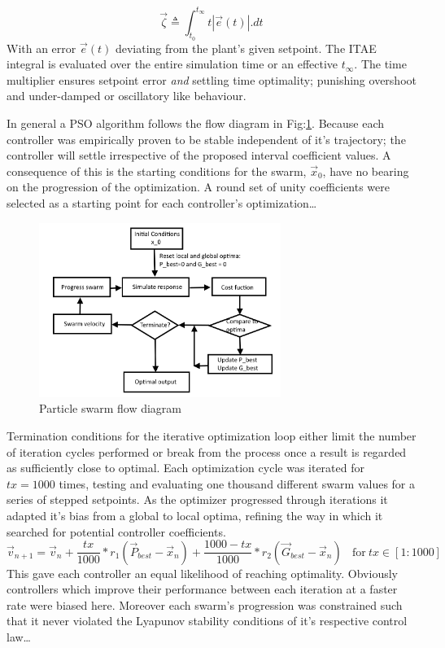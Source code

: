 \begin{equation}
\vec{\zeta}\triangleq\int_{t_0}^{t_\infty}t|\vec{e}(t)|.dt
\end{equation}
With an error $\vec{e}(t)$ deviating from the plant's given setpoint. The ITAE integral is evaluated over the entire simulation time or an effective $t_\infty$. The time multiplier ensures setpoint error \emph{and} settling time optimality; punishing overshoot and under-damped or oscillatory like behaviour.
\par
In general a PSO algorithm follows the flow diagram in Fig:\ref{fig:particle-diagram}. Because each controller was empirically proven to be stable independent of it's trajectory; the controller will settle irrespective of the proposed interval coefficient values. A consequence of this is the starting conditions for the swarm, $\vec{x}_0$, have no bearing on the progression of the optimization. A round set of unity coefficients were selected as a starting point for each controller's optimization\ldots
\begin{figure}[htbp]
\centering
\includegraphics[width=0.7\textwidth]{figs/particle-diagram}\vspace{-12pt}
\caption{Particle swarm flow diagram}
\label{fig:particle-diagram}
\vspace{-18pt}
\end{figure}
\par
Termination conditions for the iterative optimization loop either limit the number of iteration cycles performed or break from the process once a result is regarded as sufficiently close to optimal. Each optimization cycle was iterated for $tx=1000$ times, testing and evaluating one thousand different swarm values for a series of stepped setpoints. As the optimizer progressed through iterations it adapted it's bias from a global to local optima, refining the way in which it searched for potential controller coefficients.
\begin{equation}
\vec{v}_{n+1}=\vec{v}_n+\frac{tx}{1000}\ast r_1(\vec{P}_{best}-\vec{x}_n)+\frac{1000-tx}{1000}\ast r_2(\vec{G}_{best}-\vec{x}_n)~~~~\text{for}~tx\in[1:1000]
\end{equation}
This gave each controller an equal likelihood of reaching optimality. Obviously controllers which improve their performance between each iteration at a faster rate were biased here. Moreover each swarm's progression was constrained such that it never violated the Lyapunov stability conditions of it's respective control law\ldots
